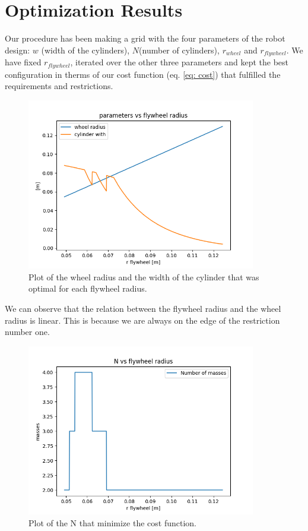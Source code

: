 \section{Optimization Results} \label{sec: parameters results}

Our procedure has been making a grid with the four parameters of the robot 
design: $w$ (width of the cylinders), $N$(number of cylinders), $r_{wheel}$ and $r_{flywheel}$.
We have fixed $r_{flywheel}$, iterated over the other three
parameters and kept the best configuration in therms of our cost function (eq. \ref{eq: cost})
that fulfilled the requirements and restrictions.

\begin{figure}[H]
	\centering
	\includegraphics[width=10cm]{img/optimization/parameters.png}
	\caption{Plot of the wheel radius and the width of the cylinder that was optimal for each flywheel radius.}
	\label{fig:Parameters plot}
\end{figure}

We can observe that the relation between the flywheel radius and 
the wheel radius is linear. This is because we are always on the
edge of the restriction number one.

\begin{figure}[H]
	\centering
	\includegraphics[width=10cm]{img/optimization/N.png}
	\caption{Plot of the N that minimize the cost function.}
	\label{fig:Parameters plot}
\end{figure}


